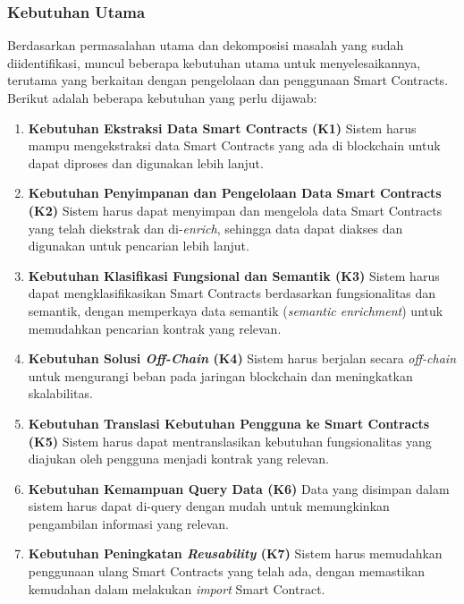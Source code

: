 \subsubsection{Kebutuhan Utama}
\label{subsubsec:kebutuhan-utama}

Berdasarkan permasalahan utama dan dekomposisi masalah yang sudah diidentifikasi, muncul beberapa kebutuhan utama untuk menyelesaikannya, terutama yang berkaitan dengan pengelolaan dan penggunaan Smart Contracts. Berikut adalah beberapa kebutuhan yang perlu dijawab:

\begin{enumerate}
	\item \textbf{Kebutuhan Ekstraksi Data Smart Contracts (K1)} \newline
	      Sistem harus mampu mengekstraksi data Smart Contracts yang ada di blockchain untuk dapat diproses dan digunakan lebih lanjut.

	\item \textbf{Kebutuhan Penyimpanan dan Pengelolaan Data Smart Contracts (K2)} \newline
	      Sistem harus dapat menyimpan dan mengelola data Smart Contracts yang telah diekstrak dan di-\textit{enrich}, sehingga data dapat diakses dan digunakan untuk pencarian lebih lanjut.

	\item \textbf{Kebutuhan Klasifikasi Fungsional dan Semantik (K3)} \newline
	      Sistem harus dapat mengklasifikasikan Smart Contracts berdasarkan fungsionalitas dan semantik, dengan memperkaya data semantik (\textit{semantic enrichment}) untuk memudahkan pencarian kontrak yang relevan.

	\item \textbf{Kebutuhan Solusi \textit{Off-Chain} (K4)} \newline
	      Sistem harus berjalan secara \textit{off-chain} untuk mengurangi beban pada jaringan blockchain dan meningkatkan skalabilitas.

	\item \textbf{Kebutuhan Translasi Kebutuhan Pengguna ke Smart Contracts (K5)} \newline
	      Sistem harus dapat mentranslasikan kebutuhan fungsionalitas yang diajukan oleh pengguna menjadi kontrak yang relevan.

	\item \textbf{Kebutuhan Kemampuan Query Data (K6)} \newline
	      Data yang disimpan dalam sistem harus dapat di-query dengan mudah untuk memungkinkan pengambilan informasi yang relevan.

	\item \textbf{Kebutuhan Peningkatan \textit{Reusability} (K7)} \newline
	      Sistem harus memudahkan penggunaan ulang Smart Contracts yang telah ada, dengan memastikan kemudahan dalam melakukan \textit{import} Smart Contract.
\end{enumerate}

